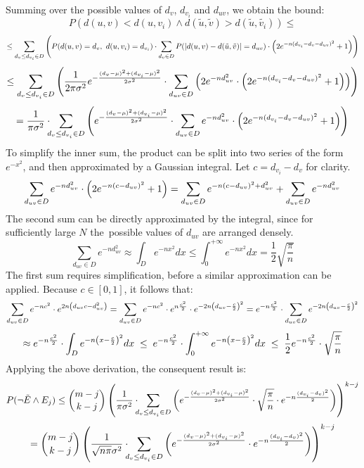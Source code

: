 Summing over the possible values of \( d_v \), \( d_{v_i} \) and \( d_{uv} \), we obtain the bound:
\[
    P(d(u, v) < d(u, v_i) \land d(\tilde{u}, \tilde{v}) > d(\tilde{u}, \tilde{v_i})) \leq
\]
\[
    \leq \sum_{d_v \leq d_{v_i} \in D} \left( P(d(u,v) = d_v, \ d(u, v_i) = d_{v_i}) \cdot \sum_{d_v \in D} P(\left| d(u, v) - d(\tilde{u}, \tilde{v}) \right| = d_{uv}) \cdot \left( 2 e^{-n(d_{v_i} - d_v - d_{uv})^2} + 1 \right) \right)
\]
\[
    \leq \sum_{d_v \leq d_{v_i} \in D} \left( \frac{1}{2 \pi \sigma^2} e^{-\frac{(d_v - \mu)^2 + (d_{v_i} - \mu)^2}{2 \sigma^2}} \cdot \sum_{d_{uv} \in D} \left( 2e^{-nd_{uv}^2} \cdot \left( 2 e^{-n(d_{v_i} - d_v - d_{uv})^2} + 1 \right) \right) \right)
\]
\[
    = \frac{1}{\pi \sigma^2} \cdot\!\!\! \sum_{d_v \leq d_{v_i} \in D} \left( e^{-\frac{(d_v - \mu)^2 + (d_{v_i} - \mu)^2}{2 \sigma^2}} \cdot \sum_{d_{uv} \in D} e^{-nd_{uv}^2} \cdot \left( 2 e^{-n(d_{v_i} - d_v - d_{uv})^2} + 1 \right) \right)
\]
To simplify the inner sum, the product can be split into two series of the form \( e^{-x^2} \), and then approximated by a Gaussian integral. Let \( c = d_{v_i} - d_v \) for clarity.
\[
    \sum_{d_{uv} \in D} e^{-nd_{uv}^2} \cdot \left( 2 e^{-n(c - d_{uv})^2} + 1 \right) = \sum_{d_{uv} \in D} e^{-n(c - d_{uv})^2 + d_{uv}^2} + \sum_{d_{uv} \in D} e^{-nd_{uv}^2}
\]
The second sum can be directly approximated by the integral, since for sufficiently large \( N \) the~possible values of \( d_{uv} \) are arranged densely.
\[
    \sum_{d_{uv} \in D} e^{-nd_{uv}^2} \approx \int_{D} e^{-nx^2} dx \leq \int_{0}^{+\infty} e^{-nx^2} dx = \frac{1}{2} \sqrt{\frac{\pi}{n}}
\]
The first sum requires simplification, before a similar approximation can be applied. Because \( c \in [0, 1] \), it follows that:
\[
    \sum_{d_{uv} \in D} e^{-nc^2} \cdot e^{2n\left( d_{uv}c - d_{uv}^2 \right)} = \sum_{d_{uv} \in D} e^{-nc^2} \cdot e^{n\frac{c^2}{2}} \cdot e^{-2n\left( d_{uv} - \frac{c}{2} \right)^2} = e^{-n\frac{c^2}{2}} \cdot \sum_{d_{uv} \in D} e^{-2n\left( d_{uv} - \frac{c}{2} \right)^2}
\]
\[
     \approx e^{-n\frac{c^2}{2}} \cdot \int_{D} e^{-n\left( x - \frac{c}{2} \right)^2} dx \;\leq\; e^{-n\frac{c^2}{2}} \cdot \int_{0}^{+\infty} e^{-n\left( x - \frac{c}{2} \right)^2} dx \;\leq\; \frac{1}{2} e^{-n\frac{c^2}{2}} \cdot  \sqrt{\frac{\pi}{n}}
\]
Applying the above derivation, the consequent result is:
\[
    P(\neg \tilde{E} \land E_j) \leq {m-j \choose k-j} \left( \frac{1}{\pi \sigma^2} \cdot\!\!\! \sum_{d_v \leq d_{v_i} \in D} \left( e^{-\frac{(d_v - \mu)^2 + (d_{v_i} - \mu)^2}{2 \sigma^2}} \cdot \sqrt{\frac{\pi}{n}} \cdot e^{-n\frac{(d_{v_i} - d_v)^2}{2}} \right) \right)^{k-j}
\]
\[
    = {m-j \choose k-j} \left( \frac{1}{\sqrt{n \pi} \sigma^2} \cdot\!\!\! \sum_{d_v \leq d_{v_i} \in D} \left( e^{-\frac{(d_v - \mu)^2 + (d_{v_i} - \mu)^2}{2 \sigma^2}} \cdot e^{-n\frac{(d_{v_i} - d_v)^2}{2}} \right) \right)^{k-j}
\]
\\

